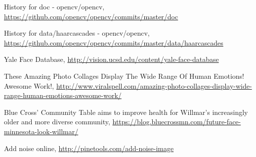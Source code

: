 \documentclass[10pt,twocolumn,letterpaper]{article}
\begin{document}
\begin{thebibliography}{99}
History for doc - opencv/opencv,
\url{https://github.com/opencv/opencv/commits/master/doc}

History for data/haarcascades - opencv/opencv,
\url{https://github.com/opencv/opencv/commits/master/data/haarcascades}

Yale Face Database,
\url{http://vision.ucsd.edu/content/yale-face-database}

These Amazing Photo Collages Display The Wide Range Of Human Emotions! Awesome Work!,
\url{http://www.viralspell.com/amazing-photo-collages-display-wide-range-human-emotions-awesome-work/}

Blue Cross' Community Table aims to improve health for Willmar's increasingly older and more diverse community,
\url{https://blog.bluecrossmn.com/future-face-minnesota-look-willmar/}

Add noise online,
\url{http://pinetools.com/add-noise-image}

\end{thebibliography}
\end{document}
